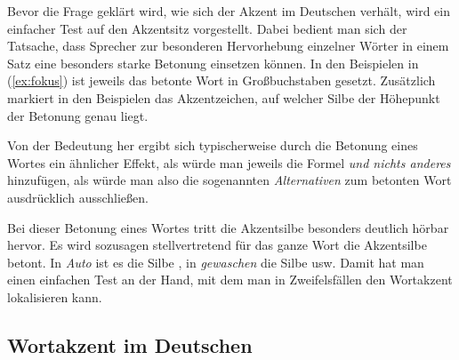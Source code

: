 \begin{exe}
\end{exe}

Bevor die Frage geklärt wird, wie sich der Akzent im Deutschen verhält, wird ein einfacher Test auf den Akzentsitz vorgestellt.
Dabei bedient man sich der Tatsache, dass Sprecher zur besonderen Hervorhebung einzelner Wörter in einem Satz eine besonders starke Betonung einsetzen können.
In den Beispielen in (\ref{ex:fokus}) ist jeweils das betonte Wort in Großbuchstaben gesetzt.
Zusätzlich markiert in den Beispielen das Akzentzeichen, auf welcher Silbe der Höhepunkt der Betonung genau liegt.

\begin{exe}
  \ex\label{ex:fokus}
  \begin{xlist}
  \end{xlist}
\end{exe}

Von der Bedeutung her ergibt sich typischerweise durch die Betonung eines Wortes ein ähnlicher Effekt, als würde man jeweils die Formel \textit{und nichts anderes} hinzufügen, als würde man also die sogenannten \textit{Alternativen} zum betonten Wort ausdrücklich ausschließen.

\begin{exe}
  \ex\label{ex:fokus-deutlich}
  \begin{xlist}
  \end{xlist}
\end{exe}

Bei dieser Betonung eines Wortes tritt die Akzentsilbe besonders deutlich hörbar hervor.
Es wird sozusagen stellvertretend für das ganze Wort die Akzentsilbe betont.
In \textit{Auto} ist es die Silbe \textipa{[\t{aO}]}, in \textit{gewaschen} die Silbe \textipa{[vaS]} usw.
Damit hat man einen einfachen Test an der Hand, mit dem man in Zweifelsfällen den Wortakzent lokalisieren kann.

\subsection{Wortakzent im Deutschen}

\label{sec:deutscherwortakzent}

